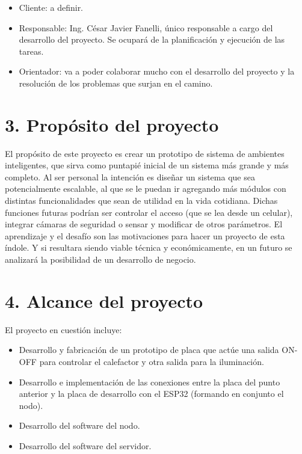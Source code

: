 \documentclass[
11pt, %
]{charter}
\begin{document}
\begin{itemize}
	\item Cliente: a definir.%
	\item Responsable: Ing. César Javier Fanelli, único responsable a cargo del desarrollo del proyecto. Se ocupará de la planificación y ejecución de las tareas.
	\item Orientador: va a poder colaborar mucho con el desarrollo del proyecto y la resolución de los problemas que surjan en el camino.
\end{itemize}

\section{3. Propósito del proyecto}
\label{sec:proposito}

El propósito de este proyecto es crear un prototipo de sistema de ambientes inteligentes, que sirva como puntapié inicial de un sistema más grande y más completo. Al ser personal la intención es diseñar un sistema que sea potencialmente escalable, al que se le puedan ir agregando más módulos con distintas funcionalidades que sean de utilidad en la vida cotidiana. Dichas funciones futuras podrían ser controlar el acceso (que se lea desde un celular), integrar cámaras de seguridad o sensar y modificar de otros parámetros. El aprendizaje y el desafío son las motivaciones para hacer un proyecto de esta índole. Y si resultara siendo viable técnica y económicamente, en un futuro se analizará la posibilidad de un desarrollo de negocio.

\section{4. Alcance del proyecto}
\label{sec:alcance}

El proyecto en cuestión incluye:
\begin{itemize}
	\item Desarrollo y fabricación de un prototipo de placa que actúe una salida ON-OFF para controlar el calefactor y otra salida para la iluminación.
	\item Desarrollo e implementación de las conexiones entre la placa del punto anterior y la placa de desarrollo con el ESP32 (formando en conjunto el nodo).
	\item Desarrollo del software del nodo.
	\item Desarrollo del software del servidor.
\end{itemize}
\end{document}
